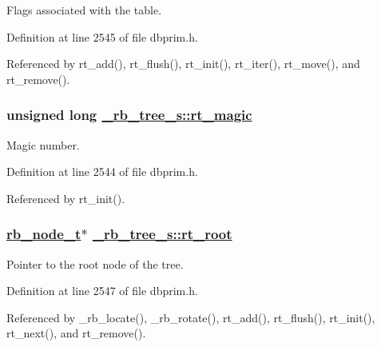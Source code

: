 Flags associated with the table. 

Definition at line 2545 of file dbprim.h.

Referenced by rt\_\-add(), rt\_\-flush(), rt\_\-init(), rt\_\-iter(), rt\_\-move(), and rt\_\-remove().\hypertarget{struct__rb__tree__s_o0}{
\subsubsection[rt\_\-magic]{\setlength{\rightskip}{0pt plus 5cm}unsigned long \hyperlink{struct__rb__tree__s_o0}{\_\-rb\_\-tree\_\-s::rt\_\-magic}}}
\label{struct__rb__tree__s_o0}


Magic number. 

Definition at line 2544 of file dbprim.h.

Referenced by rt\_\-init().\hypertarget{struct__rb__tree__s_o3}{
\subsubsection[rt\_\-root]{\setlength{\rightskip}{0pt plus 5cm}\hyperlink{struct__rb__node__s}{rb\_\-node\_\-t}$\ast$ \hyperlink{struct__rb__tree__s_o3}{\_\-rb\_\-tree\_\-s::rt\_\-root}}}
\label{struct__rb__tree__s_o3}


Pointer to the root node of the tree. 

Definition at line 2547 of file dbprim.h.

Referenced by \_\-rb\_\-locate(), \_\-rb\_\-rotate(), rt\_\-add(), rt\_\-flush(), rt\_\-init(), rt\_\-next(), and rt\_\-remove().